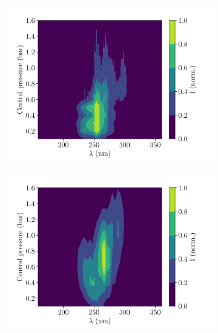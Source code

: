 \documentclass[a4paper]{jpconf}
\begin{document}
\begin{figure}[h]
\centering
 \begin{subfigure}{0.49\textwidth}
        \includegraphics[width=\textwidth]{im/2d_spectra_pres_Ar_150mW_meas}
    \caption{}
    \end{subfigure}
    \begin{subfigure}{0.49\textwidth}
        \includegraphics[width=\textwidth]{im/2d_Ar_sim}
    \caption{}
    \end{subfigure}   
     \begin{subfigure}{0.49\textwidth}

\end{subfigure}
\end{figure}
\end{document}
